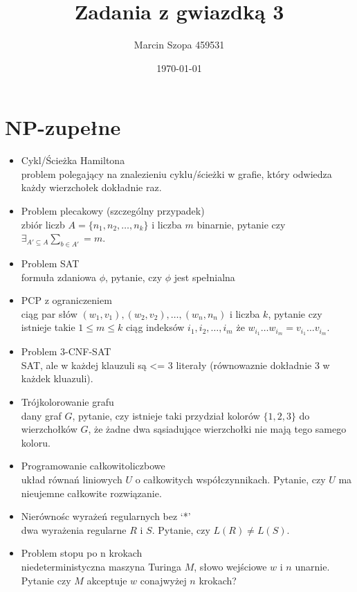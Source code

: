 \documentclass{article}
\title{Zadania z gwiazdką 3}
\author{Marcin Szopa 459531}
\date{\today}
\theoremstyle{definition}
\theoremstyle{remark}
\begin{document}
\section{NP-zupełne}

\begin{itemize}
    \item Cykl/Ścieżka Hamiltona \\
    problem polegający na znalezieniu cyklu/ścieżki w grafie, który odwiedza każdy wierzchołek dokładnie raz.
    
    \item Problem plecakowy (szczególny przypadek) \\
    zbiór liczb $A=\{n_1,n_2,\ldots,n_k\}$ i liczba $m$ binarnie, pytanie czy $\exists_{A' \subseteq A} \sum_{b \in A'}= m$.
    
    \item Problem SAT \\
    formuła zdaniowa $\phi$, pytanie, czy $\phi$ jest spełnialna

    \item PCP z ograniczeniem \\
    ciąg par słów $(w_1, v_1), (w_2, v_2), \ldots, (w_n, n_n)$ i liczba $k$,
     pytanie czy istnieje takie $1 \leq m \leq k$ ciąg indeksów $i_1, i_2, \ldots, i_m$ że $ w_{i_1} \ldots w_{i_m} = v_{i_1} \ldots v_{i_m}$.
    
    \item Problem 3-CNF-SAT \\
    SAT, ale w każdej klauzuli są <= 3 literały (równowaznie dokładnie 3 w każdek kluazuli).
    
    \item Trójkolorowanie grafu \\
    dany graf $G$, pytanie, czy istnieje taki przydział kolorów $\{1,2,3\}$ do wierzchołków $G$, że żadne dwa sąsiadujące wierzchołki nie mają tego samego koloru.
    
    \item Programowanie całkowitoliczbowe \\
    układ równań liniowych $U$ o całkowitych współczynnikach. Pytanie, czy $U$ ma nieujemne całkowite rozwiązanie.
    
    \item Nierównośc wyrażeń regularnych bez `*' \\
    dwa wyrażenia regularne $R$ i $S$. Pytanie, czy $L(R) \neq L(S)$.
    
    \item Problem stopu po n krokach \\
    niedeterministyczna maszyna Turinga $M$, słowo wejściowe $w$ i $n$ unarnie. Pytanie czy $M$ akceptuje $w$ conajwyżej $n$ krokach?
\end{itemize}
\end{document}
